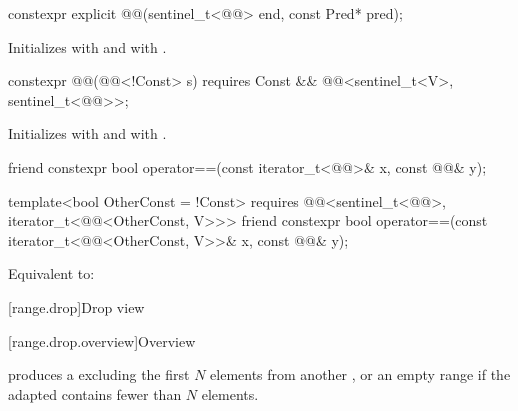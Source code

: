 %
\begin{itemdecl}
constexpr explicit @@(sentinel_t<@@> end, const Pred* pred);
\end{itemdecl}

\begin{itemdescr}
\pnum
\effects
Initializes  with  and  with .
\end{itemdescr}

%
\begin{itemdecl}
constexpr @@(@@<!Const> s)
  requires Const && @@<sentinel_t<V>, sentinel_t<@@>>;
\end{itemdecl}

\begin{itemdescr}
\pnum
\effects
Initializes  with  and
 with .
\end{itemdescr}

%
\begin{itemdecl}
friend constexpr bool operator==(const iterator_t<@@>& x, const @@& y);

template<bool OtherConst = !Const>
  requires @@<sentinel_t<@@>, iterator_t<@@<OtherConst, V>>>
friend constexpr bool operator==(const iterator_t<@@<OtherConst, V>>& x,
                                 const @@& y);
\end{itemdecl}

\begin{itemdescr}
\pnum
\effects
Equivalent to:
\end{itemdescr}

[range.drop]{Drop view}

[range.drop.overview]{Overview}

\pnum
{} produces a 
excluding the first $N$ elements from another , or
an empty range if the adapted  contains fewer than $N$ elements.

